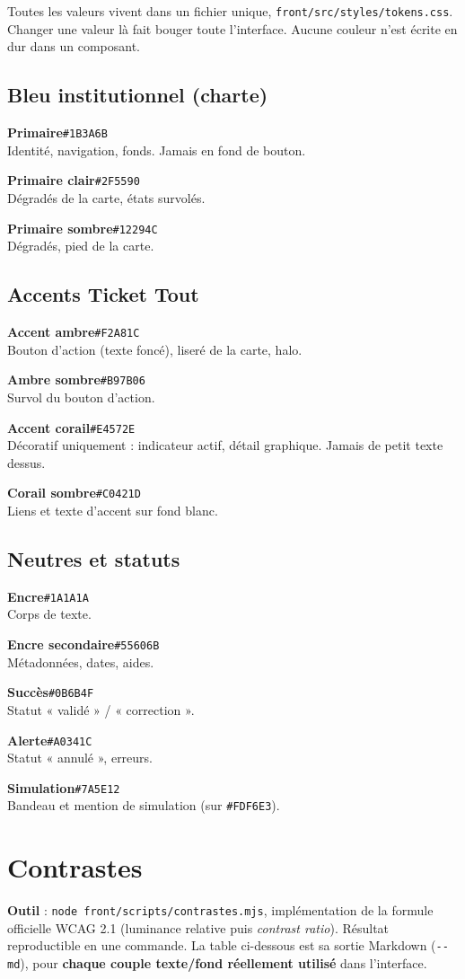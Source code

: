 \documentclass[11pt,a4paper]{article}
\newcommand{\hex}[1]{\texttt{\small #1}}
\newcommand{\code}[1]{\texttt{\small #1}}
\newcommand{\swatch}[4]{%
  \noindent\begin{minipage}[t]{\linewidth}
  \colorbox{#1}{\rule{0pt}{22pt}\hspace{58pt}}\hspace{8pt}%
  \begin{minipage}[b]{0.78\linewidth}
  \textbf{#2}\quad\hex{#3}\\[1pt]{\footnotesize\color{encre2}#4}
  \end{minipage}\end{minipage}\par\vspace{7pt}}
\begin{document}
Toutes les valeurs vivent dans un fichier unique,
\code{front/src/styles/tokens.css}. Changer une valeur là fait bouger toute
l'interface. Aucune couleur n'est écrite en dur dans un composant.

\subsection{Bleu institutionnel (charte)}
\swatch{primaire}{Primaire}{\#1B3A6B}{Identité, navigation, fonds. Jamais en fond de bouton.}
\swatch{primaireClair}{Primaire clair}{\#2F5590}{Dégradés de la carte, états survolés.}
\swatch{primaireSombre}{Primaire sombre}{\#12294C}{Dégradés, pied de la carte.}

\subsection{Accents Ticket Tout}
\swatch{ambre}{Accent ambre}{\#F2A81C}{Bouton d'action (texte foncé), liseré de la carte, halo.}
\swatch{ambreSombre}{Ambre sombre}{\#B97B06}{Survol du bouton d'action.}
\swatch{corail}{Accent corail}{\#E4572E}{Décoratif uniquement : indicateur actif, détail graphique. Jamais de petit texte dessus.}
\swatch{corailSombre}{Corail sombre}{\#C0421D}{Liens et texte d'accent sur fond blanc.}

\subsection{Neutres et statuts}
\swatch{encre}{Encre}{\#1A1A1A}{Corps de texte.}
\swatch{encre2}{Encre secondaire}{\#55606B}{Métadonnées, dates, aides.}
\swatch{succes}{Succès}{\#0B6B4F}{Statut « validé » / « correction ».}
\swatch{alerte}{Alerte}{\#A0341C}{Statut « annulé », erreurs.}
\swatch{simu}{Simulation}{\#7A5E12}{Bandeau et mention de simulation (sur \hex{\#FDF6E3}).}
\newpage

\section{Contrastes}

\textbf{Outil} : \code{node front/scripts/contrastes.mjs}, implémentation de
la formule officielle WCAG 2.1 (luminance relative puis \emph{contrast ratio}).
Résultat reproductible en une commande. La table ci-dessous est sa sortie
Markdown (\code{-{}-md}), pour \textbf{chaque couple texte/fond réellement
utilisé} dans l'interface.
\end{document}
